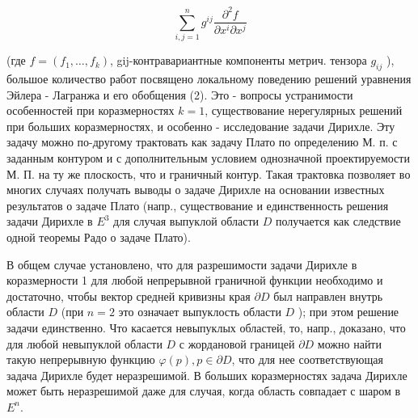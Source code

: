 \documentclass[10pt]{article}
\begin{document}
\[

\sum_{i, j=1}^{n} g^{i j} \frac{\partial^{2} f}{\partial x^{i} \partial x^{j}}

\]



(где $f=\left(f_{1}, \ldots, f_{k}\right)$, gij-контравариантные компоненты метрич. тензора $g_{i j}$ ), большое количество работ посвящено локальному поведению решений уравнения Эйлера - Лагранжа и его обобщения (2). Это - вопросы устранимости особенностей при коразмерностях $k=1$, существование нерегулярных решений при больших коразмерностях, и особенно - исследование задачи Дирихле. Эту задачу можно по-другому трактовать как задачу Плато по определению М. п. с заданным контуром и с дополнительным условием однозначной проектируемости М. П. на ту же плоскость, что и граничный контур. Такая трактовка позволяет во многих случаях получать выводы о задаче Дирихле на основании известных результатов о задаче Плато (напр., существование и единственность решения задачи Дирихле в $E^{3}$ для случая выпуклой области $D$ получается как следствие одной теоремы Радо о задаче Плато).



В общем случае установлено, что для разрешимости задачи Дирихле в коразмерности 1 для любой непрерывной граничной функции необходимо и достаточно, чтобы вектор средней кривизны края $\partial D$ был направлен внутрь области $D$ (при $n=2$ это означает выпуклость области $D$ ); при этом решение задачи единственно. Что касается невыпуклых областей, то, напр., доказано, что для любой невыпуклой области $D$ с жордановой границей $\partial D$ можно найти такую непрерывную функцию $\varphi(p), p \in \partial D$, что для нее соответствующая задача Дирихле будет неразрешимой. В больших коразмерностях задача Дирихле может быть неразрешимой даже для случая, когда область совпадает с шаром в $E^{n}$.
\end{document}
